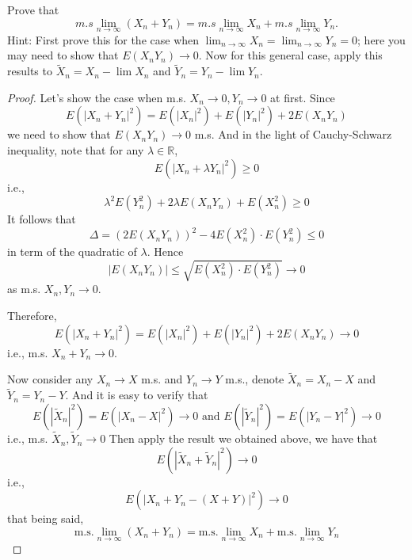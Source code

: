    \problem
    \begin{question}
        Prove that
        \[m.s \lim_{n\rightarrow \infty}(X_n+Y_n)=m.s \lim_{n\rightarrow \infty}X_n+m.s \lim_{n\rightarrow \infty}Y_n.\]
        Hint:  First prove this for the case when $\lim_{n\rightarrow \infty}X_n=\lim_{n\rightarrow \infty}Y_n=0$;
        here you may need to show that $E(X_nY_n)\rightarrow 0$.  Now for this general case, apply this results to $\tilde X_n=X_n-\lim X_n$ and $\tilde Y_n=Y_n-\lim Y_n$.
    \end{question}
    \begin{proof}
        Let's show the case when m.s. $X_n\to 0,Y_n\to 0$ at first.
        Since
        \[E(|X_n+Y_n|^2)=E(|X_n|^2)+E(|Y_n|^2)+2E(X_nY_n)\]
        we need to show that $E(X_nY_n)\to 0$ m.s.
        And in the light of Cauchy-Schwarz inequality, note that
        for any $\lambda\in\mathbb R$,
        \[E(|X_n+\lambda Y_n|^2)\geq 0\]
        i.e.,
        \[\lambda^2E(Y_n^2)+2\lambda E(X_nY_n)+E(X_n^2)\geq 0\]
        It follows that
        \[\Delta=(2E(X_nY_n))^2-4E(X_n^2)\cdot E(Y_n^2)\leq 0\]
        in term of the quadratic of $\lambda$. Hence
        \[|E(X_nY_n)|\leq\sqrt{E(X_n^2)\cdot E(Y_n^2)}\to 0\]
        as m.s. $X_n,Y_n\to 0$.

        Therefore,
        \[E(|X_n+Y_n|^2)=E(|X_n|^2)+E(|Y_n|^2)+2E(X_nY_n)\to 0\]
        i.e., m.s. $X_n+Y_n\to 0$.

        Now consider any $X_n\to X$ m.s. and $Y_n\to Y$ m.s.,
        denote $\tilde X_n=X_n-X$ and $\tilde Y_n=Y_n-Y$.
        And it is easy to verify that
        \[E(|\tilde X_n|^2)=E(|X_n-X|^2)\to 0
        \text{ and }
        E(|\tilde Y_n|^2)=E(|Y_n-Y|^2)\to 0 \]
        i.e., m.s. $\tilde X_n,\tilde Y_n\to 0$
        Then apply the result we obtained above, we have that
        \[E(|\tilde X_n+\tilde Y_n|^2)\to 0\]
        i.e.,
        \[E(|X_n+Y_n-(X+Y)|^2)\to 0\]
        that being said,
        \[\text{m.s.}\lim_{n\to\infty}(X_n+Y_n)
        =\text{m.s.}\lim_{n\to\infty}X_n
        +\text{m.s.}\lim_{n\to\infty}Y_n\]
    \end{proof}

